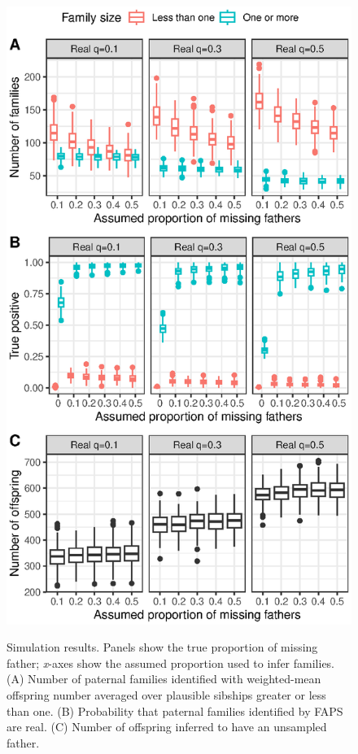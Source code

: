 \documentclass[10pt, a4paper, twocolumn]{article} %
\begin{document}
\begin{figure}
    \centering
    \includegraphics{simulations.eps}
    \label{fig:simulations}
    \caption{
        Simulation results.
        Panels show the true proportion of missing father; \textit{x}-axes show the assumed proportion used to infer families.
        (A) Number of paternal families identified with weighted-mean offspring number averaged over plausible sibships greater or less than one.
        (B) Probability that paternal families identified by FAPS are real.
        (C) Number of offspring inferred to have an unsampled father.
    }
\end{figure}
\end{document}
